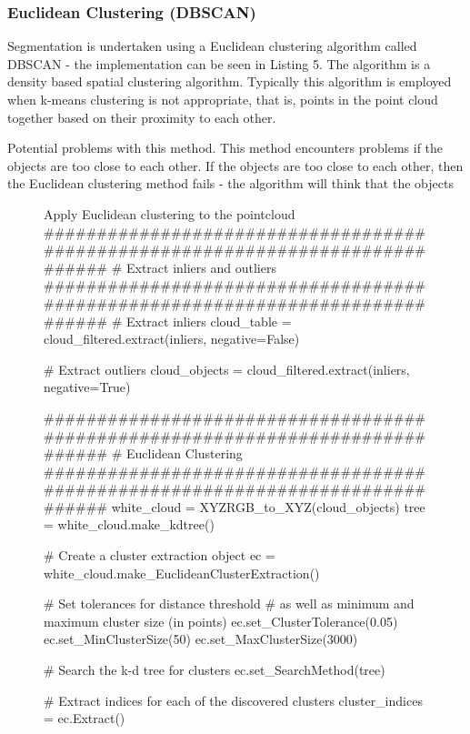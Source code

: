 \documentclass[a4paper]{article}
\begin{document}
\newpage

\subsubsection{Euclidean Clustering (DBSCAN)}
Segmentation is undertaken using a Euclidean clustering algorithm called DBSCAN - the implementation can be seen in Listing 5. The algorithm is a density based spatial clustering algorithm. Typically this algorithm is employed when k-means clustering is not appropriate, that is,  points in the point cloud together based on their proximity to each other.

Potential problems with this method. This method encounters problems if the objects are too close to each other. If the objects are too close to each other, then the Euclidean clustering method fails - the algorithm will think that the objects 

\vspace{1cm}

\begin{figure}[h]\scriptsize
\begin{sexylisting}{Apply Euclidean clustering to the pointcloud}
##############################################################################
    # Extract inliers and outliers
##############################################################################
    # Extract inliers
    cloud_table = cloud_filtered.extract(inliers, negative=False)

    # Extract outliers
    cloud_objects = cloud_filtered.extract(inliers, negative=True)


##############################################################################
    # Euclidean Clustering
##############################################################################
    white_cloud = XYZRGB_to_XYZ(cloud_objects)
    tree = white_cloud.make_kdtree()

    # Create a cluster extraction object
    ec = white_cloud.make_EuclideanClusterExtraction()

    # Set tolerances for distance threshold
    # as well as minimum and maximum cluster size (in points)
    ec.set_ClusterTolerance(0.05)
    ec.set_MinClusterSize(50)
    ec.set_MaxClusterSize(3000)

    # Search the k-d tree for clusters
    ec.set_SearchMethod(tree)

    # Extract indices for each of the discovered clusters
    cluster_indices = ec.Extract()
\end{sexylisting}
\end{figure}
\end{document}
